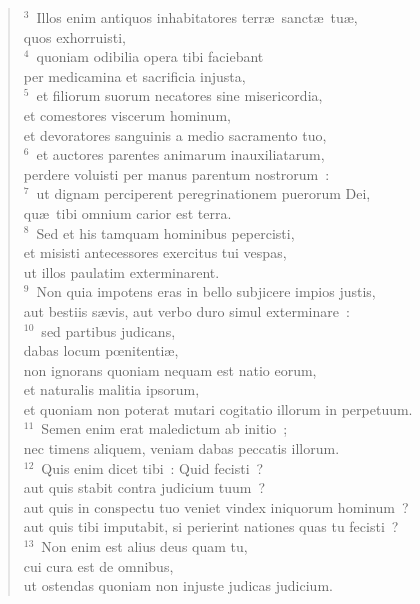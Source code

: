 \begin{verse}${}^{3}$~Illos enim antiquos inhabitatores terr\ae\ sanct\ae\ tu\ae ,\\ quos exhorruisti,\\
${}^{4}$~quoniam odibilia opera tibi faciebant\\ per medicamina et sacrificia injusta,\\
${}^{5}$~et filiorum suorum necatores sine misericordia,\\ et comestores viscerum hominum,\\ et devoratores sanguinis a medio sacramento tuo,\\
${}^{6}$~et auctores parentes animarum inauxiliatarum,\\ perdere voluisti per manus parentum nostrorum~:\\
${}^{7}$~ut dignam perciperent peregrinationem puerorum Dei,\\ qu\ae\ tibi omnium carior est terra.\\
${}^{8}$~Sed et his tamquam hominibus pepercisti,\\ et misisti antecessores exercitus tui vespas,\\ ut illos paulatim exterminarent.\\
${}^{9}$~Non quia impotens eras in bello subjicere impios justis,\\ aut bestiis s\ae vis, aut verbo duro simul exterminare~:\\
${}^{10}$~sed partibus judicans,\\ dabas locum pœnitenti\ae ,\\ non ignorans quoniam nequam est natio eorum,\\ et naturalis malitia ipsorum,\\ et quoniam non poterat mutari cogitatio illorum in perpetuum.\\
${}^{11}$~Semen enim erat maledictum ab initio~;\\ nec timens aliquem, veniam dabas peccatis illorum.\\
${}^{12}$~Quis enim dicet tibi~: Quid fecisti~?\\ aut quis stabit contra judicium tuum~?\\ aut quis in conspectu tuo veniet vindex iniquorum hominum~?\\ aut quis tibi imputabit, si perierint nationes quas tu fecisti~?\\
${}^{13}$~Non enim est alius deus quam tu,\\ cui cura est de omnibus,\\ ut ostendas quoniam non injuste judicas judicium.\\

\end{verse}
